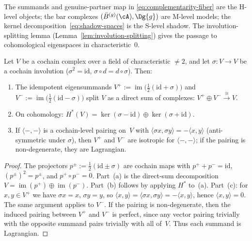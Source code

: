 \begin{remark}
The summands and genuine-partner map in
\eqref{eq:complementarity-fiber} are the H-level objects; the bar complexes
$(\bar{B}^{(g)}(\cA), \Dg{g})$ are M-level models; the kernel
decomposition~\eqref{eq:shadow-spaces} is the S-level shadow.
The involution-splitting lemma
(Lemma~\ref{lem:involution-splitting}) gives the passage to
cohomological eigenspaces in characteristic~$0$.
\end{remark}

\begin{lemma}
\label{lem:involution-splitting}
Let $V$ be a cochain complex over a field of characteristic $\neq 2$,
and let $\sigma \colon V \to V$ be a cochain involution
($\sigma^2 = \mathrm{id}$, $\sigma \circ d = d \circ \sigma$). Then:
\begin{enumerate}[label=\textup{(\alph*)}]
\item The idempotent eigensummands
 $V^+ := \operatorname{im}\bigl(\frac{1}{2}(\mathrm{id}+\sigma)\bigr)$ and
 $V^- := \operatorname{im}\bigl(\frac{1}{2}(\mathrm{id}-\sigma)\bigr)$
 split $V$ as a direct sum of complexes:
 $V^+ \oplus V^- \xrightarrow{\;\cong\;} V$.
\item On cohomology:
 $H^*(V) = \ker(\sigma - \mathrm{id}) \oplus \ker(\sigma + \mathrm{id})$.
\item If $\langle -,- \rangle$ is a cochain-level pairing on~$V$
 with $\langle \sigma x, \sigma y \rangle = -\langle x, y \rangle$
 \textup{(}anti-symmetric under $\sigma$\textup{)}, then $V^+$ and
 $V^-$ are isotropic for $\langle -,- \rangle$; if the pairing is
 non-degenerate, they are Lagrangian.
\end{enumerate}
\end{lemma}

\begin{proof}
The projectors $p^\pm := \tfrac{1}{2}(\mathrm{id} \pm \sigma)$
are cochain maps with $p^+ + p^- = \mathrm{id}$,
$(p^\pm)^2 = p^\pm$, and $p^+ \circ p^- = 0$.
Part~(a) is the direct-sum decomposition
$V=\operatorname{im}(p^+)\oplus\operatorname{im}(p^-)$.
Part~(b) follows by applying $H^*$ to~(a).
Part~(c): for $x, y \in V^+$ we have $\sigma x = x$, $\sigma y = y$,
so $\langle x, y \rangle = \langle \sigma x, \sigma y \rangle
= -\langle x, y \rangle$, hence $\langle x, y \rangle = 0$.
The same argument applies to $V^-$. If the pairing is non-degenerate,
then the induced pairing between $V^+$ and $V^-$ is perfect, since any
vector pairing trivially with the opposite summand pairs trivially
with all of~$V$. Thus each summand is Lagrangian.
\end{proof}

